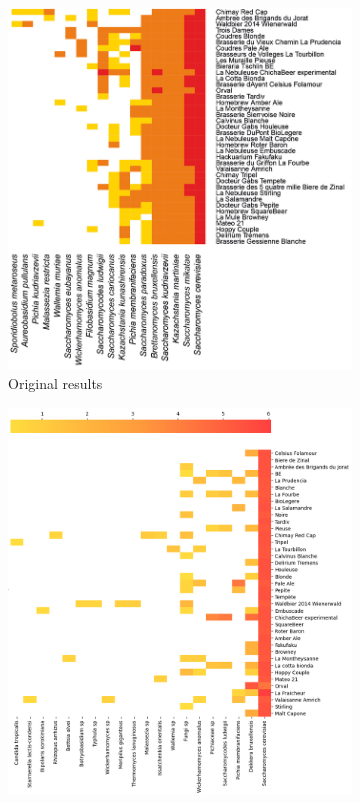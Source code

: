     \begin{figure}[H]
        \centering
        \begin{subfigure}[b]{0.6\textwidth}
            \centering
            \includegraphics[width=\textwidth]{images/beerdecoded/orginal_beerDecoded_heatmap.png}
            \caption{Original results}
            \label{fig:results:oringal_BeerDecoded_heatmap}
        \end{subfigure}
        \hfill
        \begin{subfigure}[b]{0.6\textwidth}
            \centering
            \includegraphics[width=\textwidth]{images/beerdecoded/BeerDecoded_heatmap.png}

\end{subfigure}
\end{figure}
